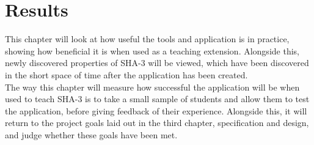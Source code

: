 \chapter{Results}
This chapter will look at how useful the tools and application is in practice, showing how beneficial it is when used as a teaching extension. Alongside this, newly discovered properties of SHA-3 will be viewed, which have been discovered in the short space of time after the application has been created.
\vspace{5mm}\\
The way this chapter will measure how successful the application will be when used to teach SHA-3 is to take a small sample of students and allow them to test the application, before giving feedback of their experience. Alongside this, it will return to the project goals laid out in the third chapter, specification and design, and judge whether these goals have been met.
